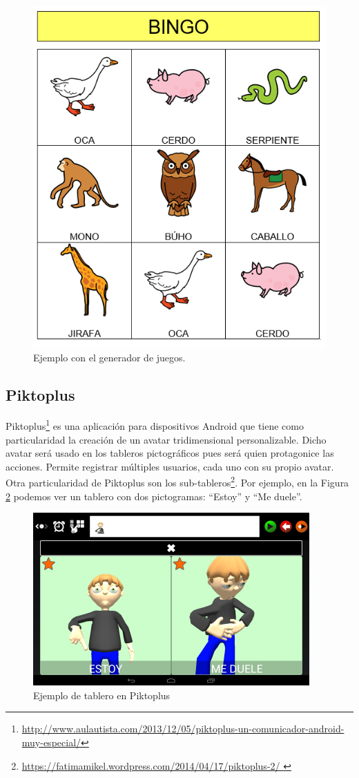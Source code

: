 \begin{itemize}
\begin{figure}[h!]
	\centering
	\includegraphics[width=0.7\linewidth]{Imagenes/Bitmap/juegoARASAAC}
	\caption{Ejemplo con el generador de juegos.}
	\label{fig:juegoarasaac}
\end{figure}



\end{itemize}

\subsection{Piktoplus}
\label{cap2:pkplus}
Piktoplus\footnote{\url{http://www.aulautista.com/2013/12/05/piktoplus-un-comunicador-android-muy-especial/}} es una aplicación para dispositivos Android que tiene como particularidad la creación de un avatar tridimensional personalizable. Dicho avatar será usado en los tableros pictográficos pues será quien protagonice las acciones. Permite registrar múltiples usuarios, cada uno con su propio avatar. Otra particularidad de Piktoplus son los sub-tableros\footnote{\url{https://fatimamikel.wordpress.com/2014/04/17/piktoplus-2/ }}. Por ejemplo, en la Figura \ref{fig:piktoplus1}  podemos ver un tablero con dos pictogramas: “Estoy” y “Me duele”.


\begin{figure}[h!]
	\centering
	\includegraphics[width=0.5\linewidth]{Imagenes/Bitmap/Piktoplus1}
	\caption[Pictoplus tablero]{Ejemplo de tablero en Piktoplus}
	\label{fig:piktoplus1}
\end{figure}

